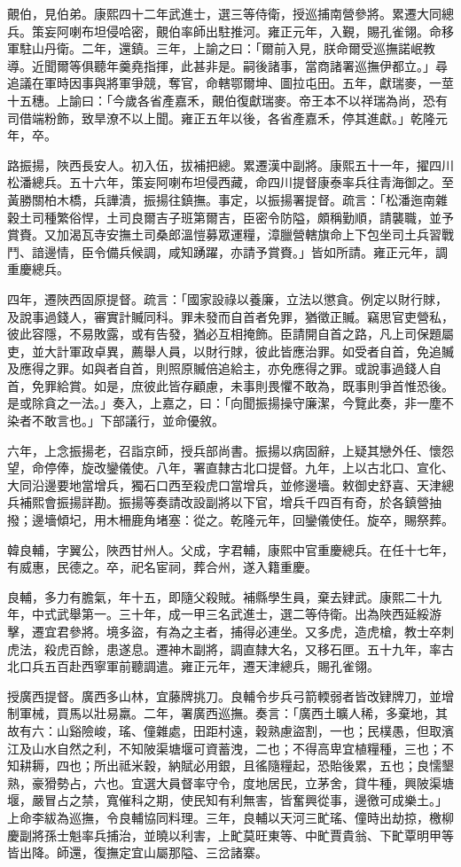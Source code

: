 \begin{pinyinscope}
覿伯，見伯弟。康熙四十二年武進士，選三等侍衛，授巡捕南營參將。累遷大同總兵。策妄阿喇布坦侵哈密，覿伯率師出駐推河。雍正元年，入覲，賜孔雀翎。命移軍駐山丹衛。二年，還鎮。三年，上諭之曰：「爾前入見，朕命爾受巡撫諾岷教導。近聞爾等俱聽年羹堯指揮，此甚非是。嗣後諸事，當商諸署巡撫伊都立。」尋追議在軍時因事與將軍爭競，奪官，命轄鄂爾坤、圖拉屯田。五年，獻瑞麥，一莖十五穗。上諭曰：「今歲各省產嘉禾，覿伯復獻瑞麥。帝王本不以祥瑞為尚，恐有司借端粉飾，致旱潦不以上聞。雍正五年以後，各省產嘉禾，停其進獻。」乾隆元年，卒。

路振揚，陜西長安人。初入伍，拔補把總。累遷漢中副將。康熙五十一年，擢四川松潘總兵。五十六年，策妄阿喇布坦侵西藏，命四川提督康泰率兵往青海御之。至黃勝關柏木橋，兵譁潰，振揚往鎮撫。事定，以振揚署提督。疏言：「松潘迤南雜穀土司種繁俗悍，土司良爾吉子班第爾吉，臣密令防隘，頗稱勤順，請襲職，並予賞賚。又加渴瓦寺安撫土司桑郎溫愷募眾運糧，漳臘營轄旗命上下包坐司土兵習戰鬥、諳邊情，臣令備兵候調，咸知踴躍，亦請予賞賚。」皆如所請。雍正元年，調重慶總兵。

四年，遷陜西固原提督。疏言：「國家設祿以養廉，立法以懲貪。例定以財行賕，及說事過錢人，審實計贓同科。罪未發而自首者免罪，猶徵正贓。竊思官吏營私，彼此容隱，不易敗露，或有告發，猶必互相掩飾。臣請開自首之路，凡上司保題屬吏，並大計軍政卓異，薦舉人員，以財行賕，彼此皆應治罪。如受者自首，免追贓及應得之罪。如與者自首，則照原贓倍追給主，亦免應得之罪。或說事過錢人自首，免罪給賞。如是，庶彼此皆存顧慮，未事則畏懼不敢為，既事則爭首惟恐後。是或除貪之一法。」奏入，上嘉之，曰：「向聞振揚操守廉潔，今覽此奏，非一塵不染者不敢言也。」下部議行，並命優敘。

六年，上念振揚老，召詣京師，授兵部尚書。振揚以病固辭，上疑其戀外任、懷怨望，命停俸，旋改鑾儀使。八年，署直隸古北口提督。九年，上以古北口、宣化、大同沿邊要地當增兵，獨石口西至殺虎口當增兵，並修邊墻。敕御史舒喜、天津總兵補熙會振揚詳勘。振揚等奏請改設副將以下官，增兵千四百有奇，於各鎮營抽撥；邊墻傾圮，用木柵鹿角堵塞：從之。乾隆元年，回鑾儀使任。旋卒，賜祭葬。

韓良輔，字翼公，陜西甘州人。父成，字君輔，康熙中官重慶總兵。在任十七年，有威惠，民德之。卒，祀名宦祠，葬合州，遂入籍重慶。

良輔，多力有膽氣，年十五，即隨父殺賊。補縣學生員，棄去肄武。康熙二十九年，中式武舉第一。三十年，成一甲三名武進士，選二等侍衛。出為陜西延綏游擊，遷宜君參將。境多盜，有為之主者，捕得必連坐。又多虎，造虎槍，教士卒刺虎法，殺虎百餘，患遂息。遷神木副將，調直隸大名，又移石匣。五十九年，率古北口兵五百赴西寧軍前聽調遣。雍正元年，遷天津總兵，賜孔雀翎。

授廣西提督。廣西多山林，宜藤牌挑刀。良輔令步兵弓箭輭弱者皆改肄牌刀，並增制軍械，買馬以壯易羸。二年，署廣西巡撫。奏言：「廣西土曠人稀，多棄地，其故有六：山谿險峻，瑤、僮雜處，田距村遠，穀熟慮盜割，一也；民樸愚，但取濱江及山水自然之利，不知陂渠塘堰可資蓄洩，二也；不得高卑宜植糧種，三也；不知耕耨，四也；所出祗米穀，納賦必用銀，且徭隨糧起，恐貽後累，五也；良懦墾熟，豪猾勢占，六也。宜選大員督率守令，度地居民，立茅舍，貸牛種，興陂渠塘堰，嚴冒占之禁，寬催科之期，使民知有利無害，皆奮興從事，邊徼可成樂土。」上命李紱為巡撫，令良輔協同料理。三年，良輔以天河三甿瑤、僮時出劫掠，檄柳慶副將孫士魁率兵捕治，並曉以利害，上甿莫旺東等、中甿賈貴翁、下甿覃明甲等皆出降。師還，復撫定宜山屬那隘、三岔諸寨。


\end{pinyinscope}
